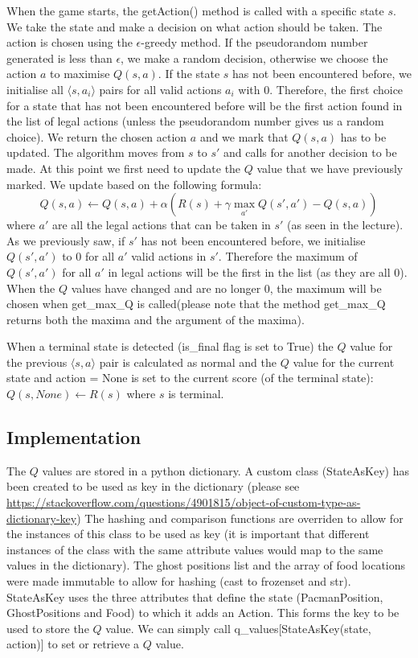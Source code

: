 \documentclass[12pt,a4paper]{article}
\begin{document}
When the game starts, the getAction() method is called with a specific state $s$. We take the state and make a decision on what action should be taken. The action is chosen using the $\epsilon$-greedy method.  If the pseudorandom number generated is less than $\epsilon$, we make a random decision, otherwise we choose the action $a$ to maximise $Q(s,a)$. If the state $s$ has not been encountered before, we initialise all $\langle s, a_i\rangle$ pairs for all valid actions $a_i$ with $0$. Therefore, the first choice for a state that has not been encountered before will be the first action found in the list of legal actions (unless the pseudorandom number gives us a random choice). We return the chosen action $a$ and we mark that $Q(s,a)$ has to be updated. The algorithm moves from $s$ to $s'$ and calls for another decision to be made. At this point we first need to update the $Q$ value that we have previously marked. We update based on the following formula:
\[Q(s, a) \leftarrow Q(s,a) + \alpha (R(s) + \gamma  \max_{a'} Q(s', a') - Q(s, a))\]
where $a'$ are all the legal actions that can be taken in $s'$ (as seen in the lecture).
As we previously saw, if $s'$ has not been encountered before, we initialise $Q(s', a')$ to 0 for all $a'$ valid actions in $s'$. Therefore the maximum of $Q(s', a')$ for all $a'$ in legal actions will be the first in the list (as they are all 0). When the $Q$ values have changed and are no longer 0, the maximum will be chosen when get\_max\_Q is called(please note that the method get\_max\_Q returns both the maxima and the argument of the maxima).

When a terminal state is detected (is\_final flag is set to True) the $Q$ value for the previous $\langle s, a\rangle$ pair is calculated as normal and the $Q$ value for the current state and action = None is set to the current score (of the terminal state): $Q(s, None) \leftarrow R(s)$ where $s$ is terminal.

\subsection{Implementation}
The $Q$ values are stored in a python dictionary. A custom class (StateAsKey) has been created to be used as key in the dictionary (please see \sloppy \url{https://stackoverflow.com/questions/4901815/object-of-custom-type-as-dictionary-key}) The hashing and comparison functions are overriden to allow for the instances of this class to be used as key (it is important that different instances of the class with the same attribute values would map to the same values in the dictionary). 
The ghost positions list and the array of food locations were made immutable to allow for hashing (cast to frozenset and str).
StateAsKey uses the three attributes that define the state (PacmanPosition, GhostPositions and Food) to which it adds an Action. This forms the key to be used to store the $Q$ value.
We can simply call q\_values[StateAsKey(state, action)] to set or retrieve a $Q$ value.
\end{document}
